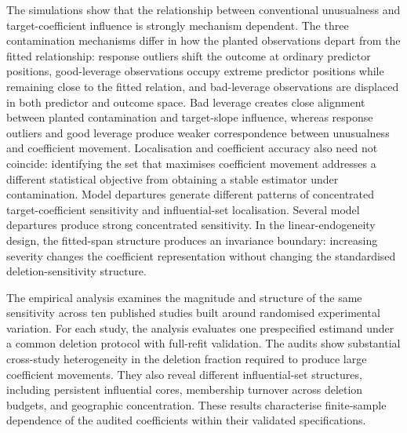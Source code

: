 \documentclass[../main.tex]{subfiles}
\begin{document}
The simulations show that the relationship between conventional unusualness and target-coefficient influence is strongly mechanism dependent. The three contamination mechanisms differ in how the planted observations depart from the fitted relationship: response outliers shift the outcome at ordinary predictor positions, good-leverage observations occupy extreme predictor positions while remaining close to the fitted relation, and bad-leverage observations are displaced in both predictor and outcome space. Bad leverage creates close alignment between planted contamination and target-slope influence, whereas response outliers and good leverage produce weaker correspondence between unusualness and coefficient movement. Localisation and coefficient accuracy also need not coincide: identifying the set that maximises coefficient movement addresses a different statistical objective from obtaining a stable estimator under contamination. Model departures generate different patterns of concentrated target-coefficient sensitivity and influential-set localisation. Several model departures produce strong concentrated sensitivity. In the linear-endogeneity design, the fitted-span structure produces an invariance boundary: increasing severity changes the coefficient representation without changing the standardised deletion-sensitivity structure.

The empirical analysis examines the magnitude and structure of the same sensitivity across ten published studies built around randomised experimental variation. For each study, the analysis evaluates one prespecified estimand under a common deletion protocol with full-refit validation. The audits show substantial cross-study heterogeneity in the deletion fraction required to produce large coefficient movements. They also reveal different influential-set structures, including persistent influential cores, membership turnover across deletion budgets, and geographic concentration. These results characterise finite-sample dependence of the audited coefficients within their validated specifications.
\end{document}
